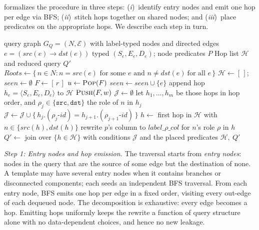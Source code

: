  formalizes the procedure in three steps:
(\emph{i})~identify entry nodes and emit one hop per edge via BFS;
(\emph{ii})~stitch hops together on shared nodes; and
(\emph{iii})~place predicates on the appropriate hops. We describe each
step in turn.

\begin{algorithm*}[t]
\caption{Pattern Decomposition}
\label{alg:decompose}
\begin{algorithmic}[1]
\Require query graph $G_Q=(N,\mathcal{E})$ with label-typed nodes and
         directed edges $e=(\mathit{src}(e)\!\rightarrow\!\mathit{dst}(e))$
         typed $(S_e,E_e,D_e)$; node predicates $P$
\Ensure  Hop list $\mathcal{H}$ and reduced query $Q'$
\Statex
\State $\mathit{Roots} \gets \{\, n \in N : n=\mathit{src}(e)\text{ for
       some }e \text{ and } n\neq\mathit{dst}(e)\ \text{for all } e \,\}$
\State $\mathcal{H} \gets [\,]$;\quad $\mathit{seen} \gets \emptyset$
  \State $F \gets [\,r\,]$
    \State $u \gets \textsc{Pop}(F)$
      \State $\mathit{seen} \gets \mathit{seen}\cup\{e\}$
      \State append hop $h_e=\langle S_e, E_e, D_e\rangle$ to $\mathcal{H}$
      \State $\textsc{Push}(F, w)$
    \EndFor
  \EndWhile
\EndFor
\Statex
\State $\mathcal{J} \gets \emptyset$
  \State let $h_{1},\dots,h_{m}$ be those hops in hop order, and
         $\rho_j\in\{\texttt{src},\texttt{dst}\}$ the role of $n$ in $h_j$
    \State $\mathcal{J} \gets \mathcal{J} \cup
           \{\, h_j.(\rho_j\text{-}\mathit{id}) =
           h_{j+1}.(\rho_{j+1}\text{-}\mathit{id}) \,\}$
  \EndFor
\EndFor
\Statex
{}
  \State $h \gets$ first hop in $\mathcal{H}$ with
         $n\in\{\mathit{src}(h),\mathit{dst}(h)\}$
  \State rewrite $p$'s column to $\mathit{label}\_\rho\_\mathit{col}$
         for $n$'s role $\rho$ in $h$
\EndFor
\State $Q' \gets$ join over $\{h\in\mathcal{H}\}$ with conditions
       $\mathcal{J}$ and the placed predicates
\State \Return $\mathcal{H},\ Q'$
\end{algorithmic}
\end{algorithm*}

\emph{Step 1: Entry nodes and hop emission.}
The traversal starts from \emph{entry nodes}: nodes in the query that are 
the source of some edge but the destination of none. A template may
have several entry nodes when it contains branches or disconnected
components; each seeds an independent BFS traversal. From each entry node,
BFS emits one hop per edge in a fixed order, visiting every out-edge of
each dequeued node. The decomposition is exhaustive: every edge becomes a
hop. Emitting hops uniformly keeps the rewrite a function of query
structure alone with no data-dependent choices, and hence no new leakage.

